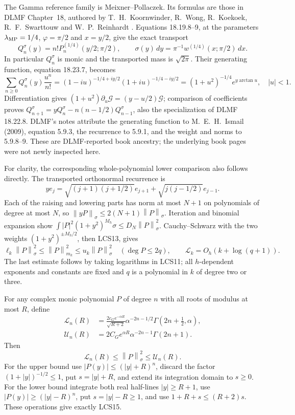 \documentclass[11pt]{article}
\newcommand{\norm}[1]{\left\lVert#1\right\rVert}
\begin{document}
The Gamma reference family is Meixner--Pollaczek. Its formulas
are those in DLMF Chapter~18, authored by T.~H.~Koornwinder,
R.~Wong, R.~Koekoek, R.~F.~Swarttouw and W.~P.~Reinhardt
\cite{dlmf18}. Equations 18.19.8--9, at the parameters
$\lambda_{\rm MP}=1/4$, $\varphi=\pi/2$ and $x=y/2$, give the
exact transport
\[
 Q_n^\sigma(y)=n!P_n^{(1/4)}(y/2;\pi/2),\qquad
 \sigma(y)\,dy=\pi^{-1}w^{(1/4)}(x;\pi/2)\,dx.
\]
In particular $Q_n^\sigma$ is monic and the transported mass is
$\sqrt{2\pi}$. Their generating function, equation 18.23.7, becomes
\[
 \sum_{n\ge0}Q_n^\sigma(y)\frac{u^n}{n!}
 =(1-iu)^{-1/4+iy/2}(1+iu)^{-1/4-iy/2}
 =(1+u^2)^{-1/4}e^{y\arctan u},\quad |u|<1.
\]
Differentiation gives $(1+u^2)\partial_u\mathcal G=(y-u/2)\mathcal G$;
comparison of coefficients proves
$Q_{n+1}^\sigma=yQ_n^\sigma-n(n-1/2)Q_{n-1}^\sigma$, also the
specialization of DLMF 18.22.8. DLMF's notes attribute the generating
function to M.~E.~H.~Ismail (2009), equation 5.9.3, the recurrence
to 5.9.1, and the weight and norms to 5.9.8--9. These are
DLMF-reported book ancestry; the underlying book pages were not
newly inspected here.

For clarity, the corresponding whole-polynomial lower comparison
also follows directly. The transported orthonormal recurrence is
\[
 ye_j=\sqrt{(j+1)(j+1/2)}e_{j+1}
           +\sqrt{j(j-1/2)}e_{j-1}.
\]
Each of the raising and lowering parts has norm at most $N+1$
on polynomials of degree at most $N$, so
$\norm{yP}_\sigma\le2(N+1)\norm P_\sigma$.
Iteration and binomial expansion show
$\int|P|^2(1+y^2)^{M_h}\sigma\le D_N\norm P_\sigma^2$.
Cauchy--Schwarz with the two weights $(1+y^2)^{\pm M_h/2}$,
then LCS13, gives
\begin{equation}\tag{LCS14}
 \ell_k\norm P_\sigma^2\le\norm P_{m_k}^2
       \le u_k\norm P_\sigma^2\quad(\deg P\le2q),\qquad
 \mathscr L_k=O_h(k+\log(q+1)).
\end{equation}
The last estimate follows by taking logarithms in LCS11; all
$h$-dependent exponents and constants are fixed and $q$ is a
polynomial in $k$ of degree two or three.

For any complex monic polynomial $P$ of degree $n$ with all roots
of modulus at most $R$, define
\begin{equation}\tag{LCS15}
\begin{aligned}
 \mathscr L_n(R)&=
 \frac{2c_Ge^{-\alpha R}}{\sqrt{R+2}}
       \alpha^{-2n-1/2}\Gamma(2n+\tfrac12,\alpha),\\
 \mathscr U_n(R)&=2C_Ge^{\alpha R}
       \alpha^{-2n-1}\Gamma(2n+1).
\end{aligned}
\end{equation}
Then
\begin{equation}\tag{LCS16}
 \mathscr L_n(R)\le\norm P_\sigma^2\le\mathscr U_n(R).
\end{equation}
For the upper bound use $|P(y)|\le(|y|+R)^n$, discard the
factor $(1+|y|)^{-1/2}\le1$, put $s=|y|+R$, and extend its
integration domain to $s\ge0$. For the lower bound integrate
both real half-lines $|y|\ge R+1$, use
$|P(y)|\ge(|y|-R)^n$, put $s=|y|-R\ge1$, and use
$1+R+s\le(R+2)s$. These operations give exactly LCS15.
\end{document}
